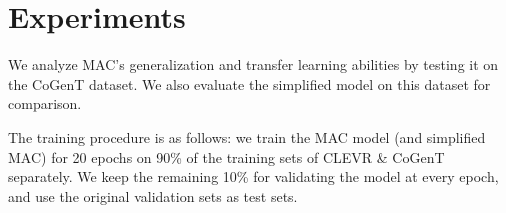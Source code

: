 \section{Experiments}

We analyze MAC's generalization and transfer learning abilities by testing it on the CoGenT dataset.
We also evaluate the simplified model on this dataset for comparison.

The training procedure is as follows: we train the MAC model (and simplified MAC) for 20 epochs on 90\% of the training sets of CLEVR \& CoGenT separately. We keep the remaining 10\% for validating the model at every epoch, and use the original validation sets as test sets.

